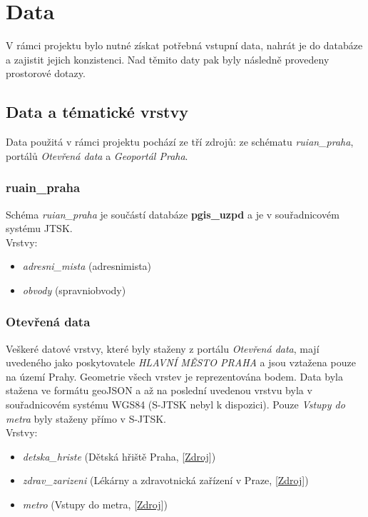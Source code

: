 \documentclass[a4paper, 12pt]{article}
\begin{document}
\section{Data}
V rámci projektu bylo nutné získat potřebná vstupní data, nahrát je do databáze a zajistit jejich konzistenci. Nad těmito daty pak byly následně provedeny prostorové dotazy.

\subsection{Data a tématické vrstvy}
Data použitá v rámci projektu pochází ze tří zdrojů: ze schématu \textit{ruian\_praha}, portálů \textit{Otevřená data} a \textit{Geoportál Praha}.

\subsubsection{ruain\_praha}
Schéma \textit{ruian\_praha} je součástí databáze \textbf{pgis\_uzpd} a je v souřadnicovém systému JTSK.\\

Vrstvy:
\begin{itemize}
\item \textsl{adresni\_mista} (adresnimista)
\item \textsl{obvody} (spravniobvody)
\end{itemize}

\subsubsection{Otevřená data}
Veškeré datové vrstvy, které byly staženy z portálu \textit{Otevřená data}, mají uvedeného jako  pos\-ky\-tovatele \textsl{HLAVNÍ MĚSTO PRAHA} a jsou vztažena pouze na území Prahy. Geometrie všech vrstev je reprezentována bodem. Data byla stažena ve formátu geoJSON a až na poslední uvedenou vrstvu byla v souřadnicovém systému WGS84 (S-JTSK nebyl k dispozici). Pouze \textsl{Vstupy do metra} byly staženy přímo v S-JTSK.\\

Vrstvy:  
\begin{itemize}
\item \textsl{detska\_hriste} (Dětská hřiště Praha, [\href{https://data.gov.cz/datov%C3%A1-sada?iri=https%3A%2F%2Fdata.gov.cz%2Fzdroj%2Fdatov%C3%A1-sada%2Fhttp---opendata.praha.eu-api-3-action-package_show-id-detska-hriste-praha}{Zdroj}])
\item \textsl{zdrav\_zarizeni} (Lékárny a zdravotnická zařízení v Praze, [\href{https://data.gov.cz/datov%C3%A1-sada?iri=https%3A%2F%2Fdata.gov.cz%2Fzdroj%2Fdatov%C3%A1-sada%2Fhttp---opendata.praha.eu-api-3-action-package_show-id-lekarny-a-zdravotnicka-zarizeni-v-praze}{Zdroj}])
\item \textsl{metro} (Vstupy do metra, [\href{https://data.gov.cz/datov%C3%A1-sada?iri=https%3A%2F%2Fdata.gov.cz%2Fzdroj%2Fdatov%C3%A1-sada%2Fhttp---opendata.praha.eu-api-3-action-package_show-id-ipr-prazska_integrovana_doprava_-_vstupy_do_metra}{Zdroj}])
\end{itemize}
\end{document}
